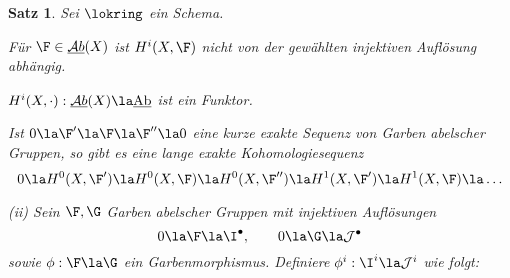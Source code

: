 \documentclass[11pt]{book}
\newtheorem{theorem}{Satz}[section]
\theoremstyle{nonumberbreak}
\newenvironment{pr}[1][]{\ifthenelse{\equal{#1}{}}{\proof}{\proof[#1]}\rm}{\endproof}
\newcommand{\AbX}{\underline{\mathcal{A}b}(X)}
\newcommand{\Ab}{\underline{\mathrm{Ab}}}
\begin{document}
\begin{spacing}{1.4}
\begin{theorem}
Sei $\lokring$ ein Schema.
\begin{compactenum}
\item Für $\F \in \AbX$ ist $H^{i}(X, \F)$ nicht von der gewählten injektiven Auflösung abhängig.
\item $H^{i}(X, \cdot): \AbX \la \Ab$ ist ein Funktor.
\item Ist $0 \la \F' \la \F \la \F'' \la 0$ eine kurze exakte Sequenz von Garben abelscher Gruppen, so gibt es eine lange exakte Kohomologiesequenz
$$0 \la H^{0}(X, \F') \la H^{0}(X, \F) \la H^{0}(X, \F'') \la H^{1}(X, \F') \la H^{1}(X, \F) \la  \ldots$$


\end{compactenum}
\begin{pr}
\begin{compactenum}
\item[(ii)] Sein $\F, \G$ Garben abelscher Gruppen mit injektiven Auflösungen 
$$0 \la \F \la \I^{\bullet}, \qquad 0 \la \G \la \mathcal{J}^{\bullet}$$
sowie $\phi: \F \la \G$ ein Garbenmorphismus. Definiere $\phi^{i}: \I^{i} \la \mathcal{J}^{i}$ wie folgt:


\end{compactenum}
\end{pr}
\end{theorem}
\end{spacing}
\end{document}
